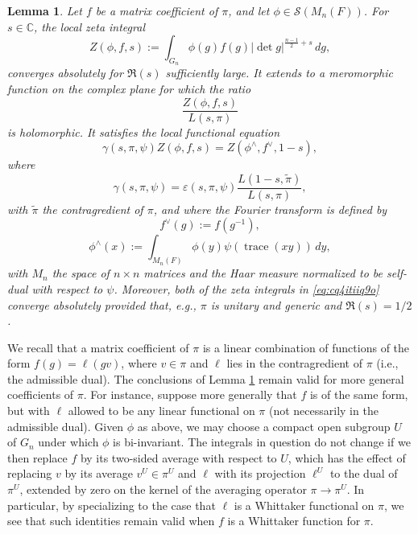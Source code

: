 \documentclass[reqno]{amsart}
\theoremstyle{plain}
\newtheorem{lemma}[theorem]{Lemma}
\theoremstyle{definition}
\begin{document}
\begin{lemma}\label{lemma:cq4itap0v1}
  Let $f$ be a matrix coefficient of $\pi$, and let $\phi \in \mathcal{S}(M_n(F))$.  For $s \in \mathbb{C}$, the local zeta integral
  \begin{equation}\label{eq:cq73uvikdb}
    Z(\phi, f, s) := \int_{G_n}
    \phi(g) f(g) \lvert \det g \rvert^{\frac{n - 1}{2} + s} \, d g,
  \end{equation}
  converges absolutely for $\Re(s)$ sufficiently large.  It extends to a meromorphic function on the complex plane for which the ratio
  \begin{equation*}
    \frac{Z(\phi, f, s)}{L(s, \pi)}
  \end{equation*}
  is holomorphic.  It satisfies the local functional equation
  \begin{equation}\label{eq:cq4itiiq9o}
    \gamma(s, \pi, \psi) Z(\phi, f, s)
    = Z(\phi^\wedge, f^\vee, 1-s),
  \end{equation}
  where
  \begin{equation*}
    \gamma(s, \pi, \psi) = \varepsilon(s, \pi, \psi) \frac{L(1 - s, \tilde{\pi})}{L(s, \pi)},
  \end{equation*}
  with $\tilde{\pi}$ the contragredient of $\pi$, and where the Fourier transform is defined by
  \begin{equation*}
    f^\vee (g) := f(g^{-1}),
  \end{equation*}
  \begin{equation*}
    \phi^\wedge(x) := \int_{M_n(F)}
    \phi(y) \psi(\operatorname{trace}(x y)) \, d y,
  \end{equation*}
  with $M_n$ the space of $n \times n$ matrices and the Haar measure normalized to be self-dual with respect to $\psi$.  Moreover, both of the zeta integrals in \eqref{eq:cq4itiiq9o} converge absolutely provided that, e.g., $\pi$ is unitary and generic and $\Re(s) = 1/2$.
\end{lemma}
We recall that a matrix coefficient of $\pi$ is a linear combination of functions of the form $f(g) = \ell(g v)$, where $v \in \pi$ and $\ell$ lies in the contragredient of $\pi$ (i.e., the admissible dual).  The conclusions of Lemma \ref{lemma:cq4itap0v1} remain valid for more general coefficients of $\pi$.  For instance, suppose more generally that $f$ is of the same form, but with $\ell$ allowed to be any linear functional on $\pi$ (not necessarily in the admissible dual).  Given $\phi$ as above, we may choose a compact open subgroup $U$ of $G_n$ under which $\phi$ is bi-invariant.  The integrals in question do not change if we then replace $f$ by its two-sided average with respect to $U$, which has the effect of replacing $v$ by its average $v^U \in \pi^U$ and $\ell$ with its projection $\ell^U$ to the dual of $\pi^U$, extended by zero on the kernel of the averaging operator $\pi \rightarrow \pi^U$.  In particular, by specializing to the case that $\ell$ is a Whittaker functional on $\pi$, we see that such identities remain valid when $f$ is a Whittaker function for $\pi$.
\end{document}
